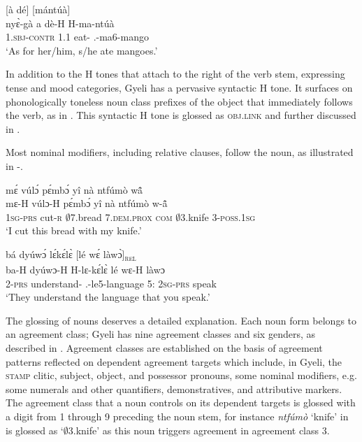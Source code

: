 \ea \label{ixx}
 [à dé] [mántúà]\\
 {\db}nyɛ̀-gà {\db}a dè-H {\db}H-ma-ntúà \\
    {\db}1.\textsc{sbj}-\textsc{contr} {\db}1.{\PST}1 eat-{\R} {\db}{\OBJ}.{\LINK}-ma6-mango   \\
    \trans `As for her/him, s/he ate mangoes.'
\z

In addition to the H tones that attach to the right of the verb stem, expressing tense and mood categories, Gyeli has a pervasive syntactic H tone. It surfaces on phonologically toneless noun class prefixes of the object that immediately follows the verb, as in . This syntactic H tone is glossed as \textsc{obj.link} and further discussed in .

Most nominal modifiers, including relative clauses, follow the noun, as illustrated in -.

\ea \label{ii}
  \glll  mɛ́ vúlɔ́ pɛ́mbɔ́ yî nà ntfúmò wã̂\\
	mɛ-H vúlɔ-H pɛ́mbɔ́ yî nà ntfúmò  w-ã̂\\
      1\textsc{sg}-\textsc{prs} cut-\textsc{r} $\emptyset$7.bread 7.\textsc{dem.prox} \textsc{com} $\emptyset$3.knife 3-\textsc{poss}.1\textsc{sg}\\
    \trans `I cut this bread with my knife.'
\z



\ea \label{iii}
  \glll bá dyúwɔ́ lɛ́kɛ́lɛ̀ [lé wɛ́ làwɔ̀]\textsubscript{\textsc{rel}}\\
         ba-H dyúwɔ-H H-lɛ-kɛ́lɛ̀ {\db}lé wɛ-H làwɔ\\
         2-\textsc{prs} understand-{\R} {\OBJ}.{\LINK}-le5-language {\db}5:{\ATT} 2\textsc{sg}-\textsc{prs} speak\\
    \trans `They understand the language that you speak.'
\z

The glossing of nouns deserves a detailed explanation. Each noun form belongs to an agreement class; Gyeli has nine agreement classes and six genders, as described in .  Agreement classes are established on the basis of agreement patterns reflected on dependent agreement targets which include, in Gyeli, the \textsc{stamp} clitic, subject, object, and possessor pronouns, some nominal modifiers, e.g. some numerals and other quantifiers, demonstratives, and attributive markers. The agreement class that a noun controls on its dependent targets is glossed with a digit from 1 through 9 preceding the noun stem, for instance {\itshape ntfúmò} `knife' in  is glossed as `$\emptyset$3.knife' as this noun triggers agreement in agreement class 3.

